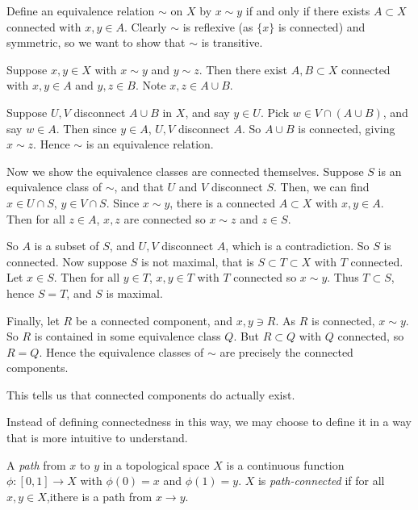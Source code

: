 \documentclass[12pt]{article}
\begin{document}
\begin{proofbox}
	Define an equivalence relation $\sim$ on $X$ by $x \sim y$ if and only if there exists $A \subset X$ connected with $x, y \in A$. Clearly $\sim$ is reflexive (as $\{x\}$ is connected) and symmetric, so we want to show that $\sim$ is transitive.

	Suppose $x, y \in X$ with $x \sim y$ and $y \sim z$. Then there exist $A, B \subset X$ connected with $x, y \in A$ and $y, z \in B$. Note $x, z \in A \cup B$.

	Suppose $U, V$ disconnect $A \cup B$ in $X$, and say $y \in U$. Pick $w \in V \cap (A \cup B)$, and say $w \in A$. Then since $y \in A$, $U, V$ disconnect $A$. So $A \cup B$ is connected, giving $x \sim z$. Hence $\sim$ is an equivalence relation.

	Now we show the equivalence classes are connected themselves. Suppose $S$ is an equivalence class of $\sim$, and that $U$ and $V$ disconnect $S$. Then, we can find $x \in U \cap S$, $y \in V \cap S$. Since $x \sim y$, there is a connected $A \subset X$ with $x,y \in A$. Then for all $z \in A$, $x, z$ are connected so $x \sim z$ and $z \in S$.

	So $A$ is a subset of $S$, and $U, V$ disconnect $A$, which is a contradiction. So $S$ is connected. Now suppose $S$ is not maximal, that is $S \subset T \subset X$ with $T$ connected. Let $x \in S$. Then for all $y \in T$, $x, y \in T$ with $T$ connected so $x \sim y$. Thus $T \subset S$, hence $S = T$, and $S$ is maximal.

	Finally, let $R$ be a connected component, and $x, y \ni R$. As $R$ is connected, $x \sim y$. So $R$ is contained in some equivalence class $Q$. But $R \subset Q$ with $Q$ connected, so $R = Q$. Hence the equivalence classes of $\sim$ are precisely the connected components.
\end{proofbox}

\begin{remark}
	This tells us that connected components do actually exist.
\end{remark}

Instead of defining connectedness in this way, we may choose to define it in a way that is more intuitive to understand.

\begin{definition}
	A \textit{path} from $x$ to $y$ in a topological space $X$ is a continuous function $\phi : [0, 1] \to X$ with $\phi(0) = x$ and $\phi(1) = y$. $X$ is \textit{path-connected} if for all $x, y \in X$,ithere is a path from $x \to y$.
\end{definition}
\end{document}
